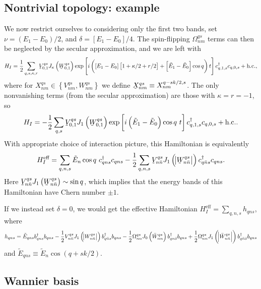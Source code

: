 \documentclass[aps,notitlepage,nofootinbib,10pt]{revtex4-1}
\renewcommand{\t}{\text} %
\newcommand{\f}[2]{\dfrac{#1}{#2}} %
\newcommand{\p}[1]{\left(#1\right)} %
\renewcommand{\sp}[1]{\left[#1\right]} %
\renewcommand{\set}[1]{\left\{#1\right\}} %
\newcommand{\1}{\mathds{1}}
\newcommand{\utilde}[1]{\underaccent{\tilde}{#1}}
\begin{document}
\subsection{Nontrivial topology: example}

We now restrict ourselves to considering only the first two bands, set
$\nu=\p{E_1-E_0}/2$, and $\delta=\sp{E_1-E_0}/4$. The spin-flipping
$\Omega^{qs}_{nm}$ terms can then be neglected by the secular
approximation, and we are left with
\begin{align}
  H_I = \f12 \sum_{q,s,\kappa,r}
  \utilde V^{qs}_{0,1} J_\kappa\p{\utilde W^{qs}_{0,1}}
  \exp\sp{i\p{\sp{E_1-E_0}\sp{1+\kappa/2+r/2}
      + \sp{\tilde E_1-\tilde E_0}\cos q}t}
  c_{q,1,s}^\dag c_{q,0,s} + \t{h.c.},
\end{align}
where for $X^{qs}_{nm}\in\set{V^{qs}_{nm},W^{qs}_{nm}}$ we define
$\utilde X^{qs}_{nm}\equiv X^{q-sk/2,s}_{nm}$. The only nonvanishing
terms (from the secular approximation) are those with $\kappa=r=-1$,
so
\begin{align}
  H_I = -\f12 \sum_{q,s}
  \utilde V^{qs}_{0,1} J_1\p{\utilde W^{qs}_{0,1}}
  \exp\sp{i\p{\tilde E_1-\tilde E_0}\cos q~ t}
  c_{q,1,s}^\dag c_{q,0,s} + \t{h.c.}.
\end{align}
With appropriate choice of interaction picture, this Hamiltonian is
equivalently
\begin{align}
  H_I^{\t{eff}}
  = \sum_{q,n,s}\tilde E_n\cos q~ c_{qns}^\dag c_{qns}
  - \f12\sum_{q,n,s}
  \utilde V^{qs}_{n\bar n} J_1\p{\abs{\utilde W^{qs}_{n\bar n}}}
  c_{q\bar ns}^\dag c_{qns}.
\end{align}
Here
$\utilde V^{qs}_{n\bar n} J_1\p{\utilde W^{qs}_{n\bar n}} \sim \sin
q$, which implies that the energy bands of this Hamiltonian have Chern
number $\pm1$.

If we instead set $\delta=0$, we would get the effective Hamiltonian
$H_I^{\t{eff}} = \sum_{q,n,s} h_{qns}$, where
\begin{align}
  h_{qns}
  = \tilde E_{qns} b_{qns}^\dag b_{qns}
  - \f12 V^{qs}_{n\bar n} J_1\p{\abs{W^{qs}_{n\bar n}}}
  b_{q\bar ns}^\dag b_{qns}
  - \f12 \Omega^{qs}_{nn} J_0\p{\bar W^{qs}_{nn}}
  b_{qn\bar s}^\dag b_{qns}
  + \f12 \Omega^{qs}_{nn} J_1\p{\abs{\bar W^{qs}_{n\bar n}}}
  b_{q\bar n\bar s}^\dag b_{qns}
\end{align}
and $\tilde E_{qns}\equiv \tilde E_n \cos\p{q+sk/2}$.


\newpage

\subsection{Wannier basis}
\end{document}
